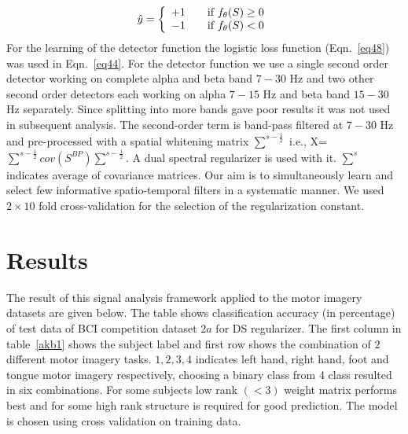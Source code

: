 \begin{equation}
  \hat{y}  = \left\{ 
  \begin{array}{l l}
    +1  & \quad \text{if $ f_{\theta}(S)\geq 0 $}\\
    -1 & \quad \text{if $ f_{\theta}(S)< 0 $}
  \end{array} \right.
  \label{decod}
\end{equation}
  For the learning of the detector function the logistic loss function (Eqn.~\ref{eq48}) was used in Eqn.~\ref{eq44}. For the detector function we use a single second order detector working on complete alpha and beta band $7-30$ Hz and two other second order detectors each working on alpha $7-15$ Hz and beta band $15-30$ Hz separately. Since splitting into more bands gave poor results it was not used in subsequent analysis. The second-order term is band-pass filtered at $7-30$ Hz and pre-processed with a spatial whitening matrix $\sum^{s-\frac{1}{2}}$ i.e., X= $\sum^{s-\frac{1}{2}}cov(S^{BP})\sum^{s-\frac{1}{2}}$. A dual spectral regularizer is used with it. $\sum^{s}$ indicates average of covariance matrices. Our aim is to simultaneously learn and select few informative spatio-temporal filters in a systematic manner. We used $ 2\times 10 $ fold cross-validation for the selection of the regularization constant.
  
\section{Results}
The result of this signal analysis framework applied to the motor imagery datasets are given below. The table shows classification accuracy (in percentage) of test data of BCI competition dataset $2a$ for DS regularizer. The first column in table~\ref{akb1} shows the subject label and first row shows the combination of $2$ different motor imagery tasks. $1, 2, 3, 4$ indicates left hand, right hand, foot and tongue motor imagery respectively, choosing a binary class from 4 class resulted in six combinations. For some subjects low rank $(<3)$ weight matrix performs best and for some high rank structure is required for good prediction. The model is chosen using cross validation on training data.

